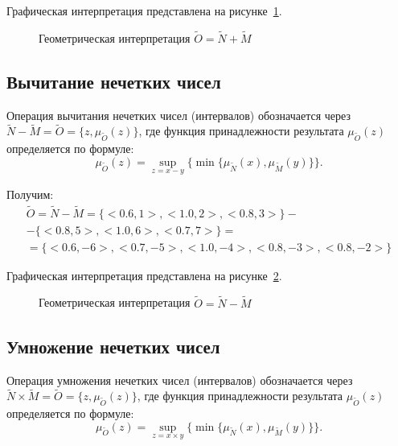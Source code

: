 Графическая интерпретация представлена на рисунке~\ref{fig:n_plus_m}.

\begin{figure}[H]
    \centering
    \caption{Геометрическая интерпретация $\tilde{O}=\tilde{N} + \tilde{M}$}
    \label{fig:n_plus_m}
\end{figure}

\subsection{Вычитание нечетких чисел}
Операция вычитания нечетких чисел (интервалов) обозначается через $\tilde{N}-\tilde{M} = \tilde{O} = \{ z, \mu_{\tilde{O}} (z) \}$, где функция принадлежности результата $\mu_{\tilde{O}} (z)$ определяется по формуле:
\[
	\mu_{\tilde{O}} (z) = \sup_{z=x-y} \{ \min \{ \mu_{\tilde{N}} (x), \mu_{\tilde{M}} (y) \} \}.
\]

Получим: 
\begin{multline*}
	\tilde{O} = \tilde{N} - \tilde{M} = \{ <0.6, 1>, <1.0, 2>, <0.8, 3> \} - \\
	- \{ <0.8, 5>, <1.0, 6>, <0.7, 7> \} = \\ 
	= \{ < 0.6, -6 >, < 0.7, -5 >, < 1.0, -4 >, < 0.8, -3 >, < 0.8, -2 > \}
\end{multline*}

Графическая интерпретация представлена на рисунке~\ref{fig:n_minus_m}.

\begin{figure}[H]
    \centering
    \caption{Геометрическая интерпретация $\tilde{O}=\tilde{N} - \tilde{M}$}
    \label{fig:n_minus_m}
\end{figure}

\subsection{Умножение нечетких чисел}
Операция умножения нечетких чисел (интервалов) обозначается через $\tilde{N} \times \tilde{M} = \tilde{O} = \{ z, \mu_{\tilde{O}} (z) \}$, где функция принадлежности результата $\mu_{\tilde{O}} (z)$ определяется по формуле:
\[
	\mu_{\tilde{O}} (z) = \sup_{z=x \times y} \{ \min \{ \mu_{\tilde{N}} (x), \mu_{\tilde{M}} (y) \} \}.
\]

